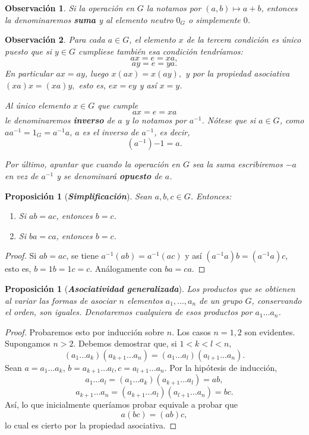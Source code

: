 \documentclass[12pt]{article}
\newtheorem{proposition}[theorem]{Proposición}
\newtheorem{observation}{Observación}[theorem]
\begin{document}
\begin{observation}Si la operación en $G$ la notamos por $(a,b)\longmapsto a+b$, entonces la denominaremos \textbf{suma} y al elemento neutro $0_G$ o simplemente $0$.
\end{observation}

\begin{observation}Para cada $a \in G$, el elemento $x$ de la tercera condición es único puesto que si $y \in G$ cumpliese también esa condición tendríamos: $$ax = e = xa,$$ $$ay = e = ya.$$ En particular $ax = ay$, luego $x(ax) = x(ay),$ y por la propiedad asociativa $(xa)x = (xa)y,$ esto es, $ex = ey$ y así $x=y$.

Al único elemento $x \in G$ que cumple $$ax = e = xa$$ le denominaremos \textbf{inverso} de $a$ y lo notamos por $a^{-1}$. Nótese que si $a \in G$, como $aa^{-1} = 1_G = a^{-1}a$, $a$ es el inverso de $a^{-1}$, es decir, $$(a^{-1}){-1} = a.$$

Por último, apuntar que cuando la operación en $G$ sea la suma escribiremos $-a$ en vez de $a^{-1}$ y se denominará \textbf{opuesto} de $a$.
\end{observation}

\begin{proposition}[\textbf{\textit{Simplificación}}] 
Sean $a,b, c \in G$. Entonces:
\begin{enumerate}
\item Si $ab = ac$, entonces $b = c$.
\item Si $ba = ca$, entonces $b = c$.
\end{enumerate}
\end{proposition}
\begin{proof}
Si $ab = ac$, se tiene $a^{-1}(ab) = a^{-1}(ac)$ y así $(a^{-1}a)b = (a^{-1}a)c$, esto es, $b = 1b = 1c = c$. Análogamente con $ba = ca$.

\end{proof}

\begin{proposition}[\textbf{\textit{Asociatividad generalizada}}] Los productos que se obtienen al variar las formas de asociar $n$ elementos $a_1, \ldots, a_n$ de un grupo $G$, \textit{conservando el orden}, son iguales. Denotaremos cualquiera de esos productos por $a_1 \ldots a_n$.
\end{proposition}
\begin{proof}
Probaremos esto por inducción sobre $n$. Los casos $n = 1,2$ son evidentes. Supongamos $n>2$. Debemos demostrar que, si $1 < k<l<n,$ $$(a_1 \ldots a_k)(a_{k+1}\ldots a_n) = (a_1 \ldots a_l)(a_{l+1} \ldots a_n).$$ Sean $a = a_1 \ldots a_k$, $b = a_{k+1} \ldots a_l, c = a_{l+1} \ldots a_n$. Por la hipótesis de inducción,  $$a_1\ldots a_l = (a_1 \ldots a_k)(a_{k+1} \ldots a_l) = ab,$$ $$a_{k+1} \ldots a_n = (a_{k+1}\ldots a_l)(a_{l+1} \ldots a_n) = bc.$$ Así, lo que inicialmente queríamos probar equivale a probar que $$a(bc) = (ab)c,$$ lo cual es cierto por la propiedad asociativa.

\end{proof}
\end{document}
